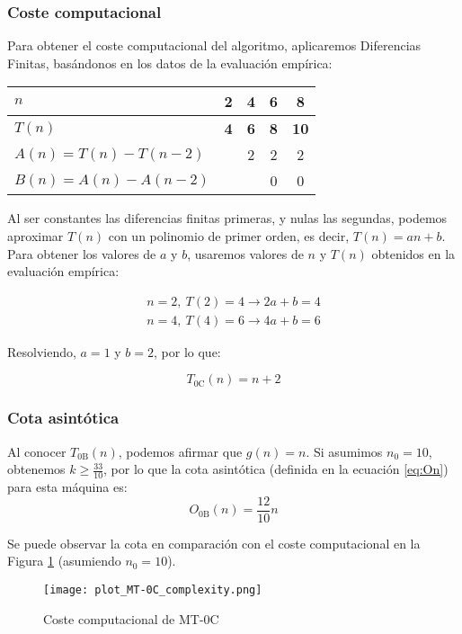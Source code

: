 \subsubsection*{Coste computacional}
Para obtener el coste computacional del algoritmo, aplicaremos Diferencias Finitas, basándonos en los datos de la evaluación empírica:

\begin{table}[H]
    \centering
    \begin{tabular}{|l|c|c|c|c|}
        \hline
        $n$ & \textbf{2} & \textbf{4} & \textbf{6} & \textbf{8} \\ \hline
        $T(n)$ & \textbf{4} & \textbf{6} & \textbf{8} & \textbf{10} \\ \hline
        \hline
        $A(n) = T(n) - T(n-2)$ &   & 2 & 2 & 2 \\ \hline
        $B(n) = A(n) - A(n-2)$ &   &   & 0 & 0 \\ \hline
    \end{tabular}
    \label{tab:0C}
\end{table}

Al ser constantes las diferencias finitas primeras, y nulas las segundas, podemos aproximar $T(n)$ con un polinomio de primer orden, es decir, $T(n) = an + b$.\\

Para obtener los valores de $a$ y $b$, usaremos valores de $n$ y $T(n)$ obtenidos en la evaluación empírica:

\begin{subequations}
    \begin{gather}
        n = 2,\ T(2) = 4 \rightarrow 2a + b = 4 \\
        n = 4,\ T(4) = 6 \rightarrow 4a + b = 6
    \end{gather}
\end{subequations}

Resolviendo, $a = 1$ y $b=2$, por lo que:

\begin{equation}
    T_{\mathrm{0C}}(n) = n + 2
\end{equation}


\subsubsection*{Cota asintótica}
Al conocer $T_{\mathrm{0B}}(n)$, podemos afirmar que $g(n) = n$. Si asumimos $n_0 = 10$, obtenemos $k \geq \frac{33}{10}$, por lo que la cota asintótica (definida en la ecuación \ref{eq:On}) para esta máquina es:
\begin{equation}
    O_{\mathrm{0B}}(n) = \frac{12}{10} n
\end{equation}

Se puede observar la cota en comparación con el coste computacional en la Figura \ref{fig:MT-0C_plot} (asumiendo $n_0 = 10$).

\begin{figure}[h]
    \centering
    \texttt{[image: plot\_MT-0C\_complexity.png]}
    \caption{Coste computacional de MT-0C}
    \label{fig:MT-0C_plot}
\end{figure}